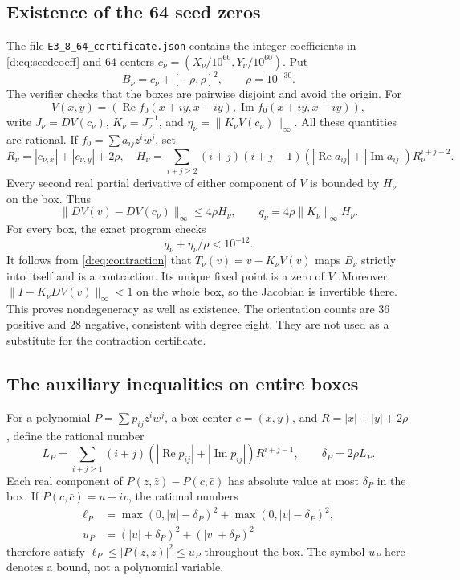 \documentclass[UTF8,11pt]{ctexart}
\theoremstyle{definition}
\numberwithin{equation}{section}
\DeclareMathOperator{\Rea}{Re}\DeclareMathOperator{\Ima}{Im}
\begin{document}
\subsection{Existence of the 64 seed zeros}
The file \texttt{E3\_8\_64\_certificate.json} contains the integer
coefficients in \eqref{d:eq:seedcoeff} and $64$ centers
$c_\nu=(X_\nu/10^{60},Y_\nu/10^{60})$. Put
\[
 B_\nu=c_\nu+[-\rho,\rho]^2,\qquad \rho=10^{-30}.
\]
The verifier checks that the boxes are pairwise disjoint and avoid the
origin. For
\[
 V(x,y)=(\Rea f_0(x+iy,x-iy),\Ima f_0(x+iy,x-iy)),
\]
write $J_\nu=DV(c_\nu)$, $K_\nu=J_\nu^{-1}$, and
$\eta_\nu=\|K_\nu V(c_\nu)\|_\infty$.
All these quantities are rational. If $f_0=\sum a_{ij}z^iw^j$, set
\[
 R_\nu=|c_{\nu,x}|+|c_{\nu,y}|+2\rho,
 \quad
 H_\nu=\sum_{i+j\ge2}(i+j)(i+j-1)
 (|\Rea a_{ij}|+|\Ima a_{ij}|)R_\nu^{i+j-2}.
\]
Every second real partial derivative of either component of $V$ is
bounded by $H_\nu$ on the box. Thus
\[
 \|DV(v)-DV(c_\nu)\|_\infty\le4\rho H_\nu,\qquad
 q_\nu=4\rho\|K_\nu\|_\infty H_\nu.
\]
For every box, the exact program checks
\begin{equation}\label{d:eq:contraction}
 q_\nu+\eta_\nu/\rho<10^{-12}.
\end{equation}
It follows from \eqref{d:eq:contraction} that
$T_\nu(v)=v-K_\nu V(v)$ maps $B_\nu$ strictly into itself and is a
contraction. Its unique fixed point is a zero of $V$. Moreover,
$\|I-K_\nu DV(v)\|_\infty<1$ on the whole box, so the Jacobian is
invertible there. This proves nondegeneracy as well as existence.
The orientation counts are $36$ positive and $28$ negative, consistent
with degree eight. They are not used as a substitute for the contraction
certificate.

\subsection{The auxiliary inequalities on entire boxes}
For a polynomial $P=\sum p_{ij}z^iw^j$, a box center $c=(x,y)$, and
$R=|x|+|y|+2\rho$, define the rational number
\[
 L_P=\sum_{i+j\ge1}(i+j)(|\Rea p_{ij}|+|\Ima p_{ij}|)R^{i+j-1},
 \qquad \delta_P=2\rho L_P.
\]
Each real component of $P(z,\bar z)-P(c,\bar c)$ has absolute value at
most $\delta_P$ in the box. If $P(c,\bar c)=u+iv$, the rational numbers
\[
 \begin{split}
 \ell_P&=\max(0,|u|-\delta_P)^2+\max(0,|v|-\delta_P)^2,\\
 u_P&=(|u|+\delta_P)^2+(|v|+\delta_P)^2
 \end{split}
\]
therefore satisfy $\ell_P\le|P(z,\bar z)|^2\le u_P$ throughout the box.
The symbol $u_P$ here denotes a bound, not a polynomial variable.
\end{document}
